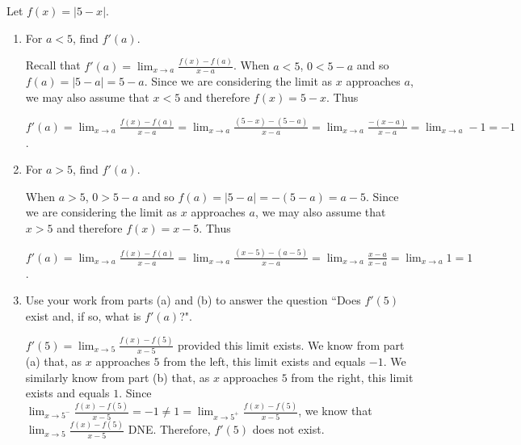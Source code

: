 \documentclass[handout,nooutcomes]{ximera}
\begin{document}
\begin{problem}
Let $f(x) = |5-x|$.
	
	\begin{enumerate}
	
	\item For $a < 5$, find $f'(a)$.
	
		\begin{freeResponse}
		Recall that $f'(a) = \lim_{x \to a} \frac{f(x) - f(a)}{x-a}$.  When $a < 5$, $0 < 5-a$ and so $f(a) = |5-a| = 5-a$.  Since we are considering the limit as $x$ approaches $a$, we may also assume that $x < 5$ and therefore $f(x) = 5-x$.  Thus
		
		$f'(a) = \lim_{x \to a} \frac{f(x) - f(a)}{x-a}
		= \lim_{x \to a} \frac{(5-x) - (5-a)}{x-a}
		= \lim_{x \to a} \frac{-(x-a)}{x-a}
		= \lim_{x \to a} -1 = -1$.
		\end{freeResponse}
		
		
	
	\item For $a > 5$, find $f'(a)$.
	
		\begin{freeResponse}
		When $a > 5$, $0 > 5-a$ and so $f(a) = |5-a| = -(5-a) = a-5$.  Since we are considering the limit as $x$ approaches $a$, we may also assume that $x > 5$ and therefore $f(x) = x-5$.  Thus
		
		$f'(a) = \lim_{x \to a} \frac{f(x) - f(a)}{x-a}
		= \lim_{x \to a} \frac{(x-5) - (a-5)}{x-a}
		= \lim_{x \to a} \frac{x-a}{x-a}
		= \lim_{x \to a} 1 = 1$.

		\end{freeResponse}
		
		
	
	\item Use your work from parts (a) and (b) to answer the question ``Does $f'(5)$ exist and, if so, what is $f'(a)$?".
	
		\begin{freeResponse}
		$f'(5) = \lim_{x \to 5} \frac{f(x) - f(5)}{x-5}$ provided this limit exists.  We know from part (a) that, as $x$ approaches $5$ from the left, this limit exists and equals $-1$.  We similarly know from part (b) that, as $x$ approaches $5$ from the right, this limit exists and equals $1$.  Since $\lim_{x \to 5^-} \frac{f(x) - f(5)}{x-5} = -1 \neq 1 = \lim_{x \to 5^+} \frac{f(x) - f(5)}{x-5}$, we know that $\lim_{x \to 5} \frac{f(x) - f(5)}{x-5}$ DNE.  Therefore, $f'(5)$ does not exist.
		\end{freeResponse}
		
		
	
	\end{enumerate}


\end{problem}
	
	
	
	
	
	
	
	
	

	










								
				
				
	
\end{document}
